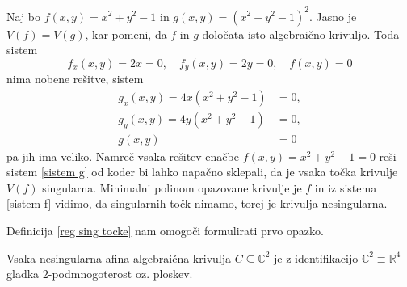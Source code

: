 \documentclass[mat1]{fmfdelo}
\numberwithin{equation}{section}
\newcommand{\R}{\mathbb R}
\newcommand{\C}{\mathbb C}
\theoremstyle{definition}
\begin{document}
\begin{primer*}
    Naj bo $f(x,y) = x^2 + y^2 - 1$ in $g(x,y) = (x^2 + y^2 - 1)^2$. Jasno je $V(f) = V(g)$, kar pomeni, da $f$ in $g$ določata isto algebraično krivuljo. Toda sistem 
    \begin{equation}
        \label{sistem f}
        f_x(x,y) = 2x = 0, \quad f_y(x,y) = 2y = 0, \quad f(x,y) = 0
    \end{equation}
    nima nobene rešitve, sistem
    \begin{align}
        \label{sistem g}
        g_x(x,y) = 4x(x^2 + y^2 - 1) &= 0, \nonumber \\ 
        g_y(x,y) = 4y(x^2 + y^2 - 1) &= 0, \\
        g(x,y) &= 0 \nonumber
    \end{align}
    pa jih ima veliko. Namreč vsaka rešitev enačbe $f(x,y) = x^2 + y^2 - 1 = 0$ reši sistem \ref{sistem g} od koder bi lahko napačno sklepali, da je vsaka točka krivulje $V(f)$ singularna. Minimalni polinom opazovane krivulje je $f$ in iz sistema \ref{sistem f} vidimo, da singularnih točk nimamo, torej je krivulja nesingularna. 
    
\end{primer*}

Definicija \ref{reg sing tocke} nam omogoči formulirati prvo opazko.

\begin{trditev}
    Vsaka nesingularna afina algebraična krivulja $C \subseteq \C^2$ je z identifikacijo $\C^2 \equiv \R^4$ gladka $2$-podmnogoterost oz. ploskev.
\end{trditev}
\end{document}
